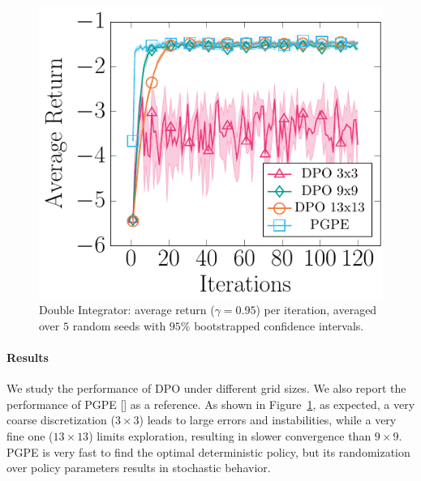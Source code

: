 \begin{figure}[t]
	\centering
	\includegraphics[scale=1.1]{plots/mass.pdf}
	\caption{Double Integrator: average return ($\gamma=0.95$) per iteration, averaged over $5$ random seeds with $95\%$ bootstrapped confidence intervals.}
	\label{fig:mass}
\end{figure}%

\paragraph{Results}
We study the performance of \ac{DPO} under different grid sizes. We also report the performance of \ac{PGPE} [\cite{sehnke2008policy}] as a reference. As shown in Figure~\ref{fig:mass}, as expected, a very coarse discretization ($3\times3$) leads to large errors and instabilities, while a very fine one ($13\times13$) limits exploration, resulting in slower convergence than $9\times9$. \ac{PGPE} is very fast to find the optimal deterministic policy, but its randomization over policy parameters results in stochastic behavior.
%

